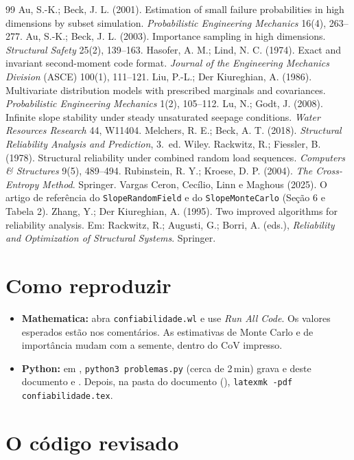 \documentclass[11pt,a4paper]{article}
\begin{document}
\begin{thebibliography}{99}
 Au, S.-K.; Beck, J. L. (2001). Estimation of small failure probabilities in high dimensions by subset
  simulation. \emph{Probabilistic Engineering Mechanics} 16(4), 263--277.
 Au, S.-K.; Beck, J. L. (2003). Importance sampling in high dimensions. \emph{Structural Safety} 25(2),
  139--163.
 Hasofer, A. M.; Lind, N. C. (1974). Exact and invariant second-moment code format. \emph{Journal of
  the Engineering Mechanics Division} (ASCE) 100(1), 111--121.
 Liu, P.-L.; Der Kiureghian, A. (1986). Multivariate distribution models with prescribed marginals and
  covariances. \emph{Probabilistic Engineering Mechanics} 1(2), 105--112.
 Lu, N.; Godt, J. (2008). Infinite slope stability under steady unsaturated seepage conditions.
  \emph{Water Resources Research} 44, W11404.
 Melchers, R. E.; Beck, A. T. (2018). \emph{Structural Reliability Analysis and Prediction}, 3.\ ed.
  Wiley.
 Rackwitz, R.; Fiessler, B. (1978). Structural reliability under combined random load sequences.
  \emph{Computers \& Structures} 9(5), 489--494.
 Rubinstein, R. Y.; Kroese, D. P. (2004). \emph{The Cross-Entropy Method}. Springer.
 Vargas Ceron, Cecílio, Linn e Maghous (2025). O artigo de referência do \texttt{SlopeRandomField} e do
  \texttt{SlopeMonteCarlo} (Seção 6 e Tabela 2).
 Zhang, Y.; Der Kiureghian, A. (1995). Two improved algorithms for reliability analysis. Em: Rackwitz,
  R.; Augusti, G.; Borri, A. (eds.), \emph{Reliability and Optimization of Structural Systems}. Springer.
\end{thebibliography}

\appendix
\section{Como reproduzir}
\begin{itemize}
  \item \textbf{Mathematica:} abra \texttt{confiabilidade.wl} e use \emph{Run All Code}. Os valores esperados estão nos
    comentários. As estimativas de Monte Carlo e de importância mudam com a semente, dentro do CoV impresso.
  \item \textbf{Python:} em , \texttt{python3 problemas.py} (cerca de 2\,min) grava
     e  deste documento e . Depois, na pasta do documento (),
    \texttt{latexmk -pdf confiabilidade.tex}.
\end{itemize}

\section{O código revisado}

\end{document}
